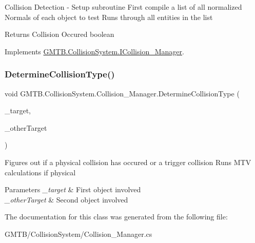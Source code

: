 Collision Detection -\/ Setup subroutine First compile a list of all normalized Normals of each object to test Runs through all entities in the list 

\begin{DoxyReturn}{Returns}
Collision Occured boolean
\end{DoxyReturn}


Implements \mbox{\hyperlink{interface_g_m_t_b_1_1_collision_system_1_1_i_collision___manager}{G\+M\+T\+B.\+Collision\+System.\+I\+Collision\+\_\+\+Manager}}.

\mbox{\label{class_g_m_t_b_1_1_collision_system_1_1_collision___manager_a04b8c27025aeb3d32f12e23dc294f607}} 
\subsubsection{\texorpdfstring{DetermineCollisionType()}{DetermineCollisionType()}}
{\footnotesize\ttfamily void G\+M\+T\+B.\+Collision\+System.\+Collision\+\_\+\+Manager.\+Determine\+Collision\+Type (\begin{DoxyParamCaption}\item[{\mbox{\hyperlink{interface_g_m_t_b_1_1_collision_system_1_1_i_collidable}{I\+Collidable}}}]{\+\_\+target,  }\item[{\mbox{\hyperlink{interface_g_m_t_b_1_1_collision_system_1_1_i_collidable}{I\+Collidable}}}]{\+\_\+other\+Target }\end{DoxyParamCaption})}



Figures out if a physical collision has occured or a trigger collision Runs M\+TV calculations if physical 


\begin{DoxyParams}{Parameters}
{\em \+\_\+target} & First object involved \\
\hline
{\em \+\_\+other\+Target} & Second object involved \\
\hline
\end{DoxyParams}


The documentation for this class was generated from the following file\+:\begin{DoxyCompactItemize}
\item 
G\+M\+T\+B/\+Collision\+System/Collision\+\_\+\+Manager.\+cs\end{DoxyCompactItemize}
